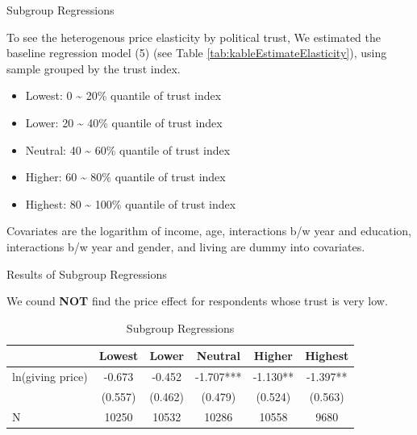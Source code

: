 \documentclass[
  ignorenonframetext,
]{beamer}
\providecommand{\tightlist}{%
  \setlength{\itemsep}{0pt}\setlength{\parskip}{0pt}}
\begin{document}
\begin{frame}{Subgroup Regressions}
\protect\hypertarget{subgroup-regressions}{}

To see the heterogenous price elasticity by political trust, We
estimated the baseline regression model (5) (see Table
\ref{tab:kableEstimateElasticity}), using sample grouped by the trust
index.

\begin{itemize}
\tightlist
\item
  Lowest: 0 \textasciitilde{} 20\% quantile of trust index
\item
  Lower: 20 \textasciitilde{} 40\% quantile of trust index
\item
  Neutral: 40 \textasciitilde{} 60\% quantile of trust index
\item
  Higher: 60 \textasciitilde{} 80\% quantile of trust index
\item
  Highest: 80 \textasciitilde{} 100\% quantile of trust index
\end{itemize}

Covariates are the logarithm of income, age, interactions b/w year and
education, interactions b/w year and gender, and living are dummy into
covariates.

\end{frame}

\begin{frame}{Results of Subgroup Regressions}
\protect\hypertarget{results-of-subgroup-regressions}{}

We cound \textbf{NOT} find the price effect for respondents whose trust
is very low.

\begin{table}

\caption{\label{tab:kableEstimateElasticityByTrustGroup}Subgroup Regressions}
\centering
\fontsize{9}{11}\selectfont
\begin{tabular}[t]{lccccc}
\toprule
 & Lowest & Lower & Neutral & Higher & Highest\\
\midrule
ln(giving price) & -0.673 & -0.452 & -1.707*** & -1.130** & -1.397**\\
 & (0.557) & (0.462) & (0.479) & (0.524) & (0.563)\\
N & 10250 & 10532 & 10286 & 10558 & 9680\\
\bottomrule
\end{tabular}
\end{table}

\end{frame}
\end{document}
